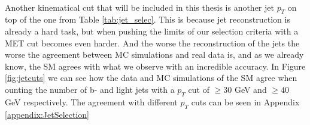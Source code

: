 \documentclass[14pt, a4paper]{book}
\begin{document}
\\Another kinematical cut that will be included in this thesis is another jet $p_T$ on top of the one from Table \ref{tab:jet_selec}. This is because jet reconstruction is already a hard task, but when pushing the limits of our selection criteria with a MET cut 
becomes even harder. And the worse the reconstruction of the jets the worse the agreement between MC simulations and real data is, and as we already know, the SM agrees with what we observe with an incredible accuracy. In Figure \ref{fig:jetcuts} we can see 
how the data and MC simulations of the SM agree when ounting the number of b- and light jets with a $p_T$ cut of $\ge30$ GeV and $\ge40$ GeV respectively. The agreement with different $p_T$ cuts can be seen in Appendix \ref{appendix:JetSelection} \\
\graphicspath{{../../../Plots/Data_Analysis/JetSelection/Control_region/}} 
\end{document}
